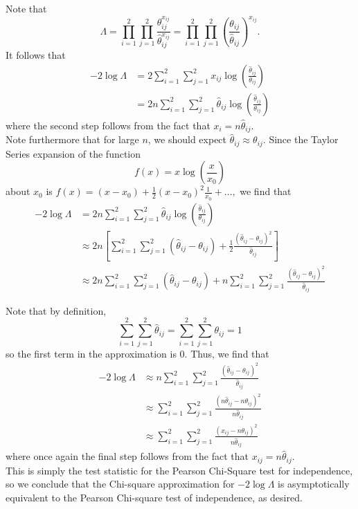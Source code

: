 \begin{enumerate}[a)]
    Note that 
    \[
        \Lambda = \prod_{i=1}^{2}\prod_{j=1}^2 \frac{\theta_{ij}^{x_{ij}}}{\hat{\theta}_{ij}^{x_{ij}}} = \prod_{i=1}^{2}\prod_{j=1}^2 \left( \frac{\theta_{ij}}{\hat{\theta}_{ij}}\right)^{x_{ij}}.
    \]
    It follows that
    \begin{align*}
        -2 \log \Lambda &= 2 \sum_{i=1}^{2} \sum_{j=1}^2 x_{ij} \log \left( \frac{\hat{\theta}_{ij}}{\theta_{ij}} \right) \\
        &= 2n \sum_{i=1}^{2} \sum_{j=1}^2 \hat{\theta}_{ij} \log \left( \frac{\hat{\theta}_{ij}}{\theta_{ij}} \right)
    \end{align*}
    where the second step follows from the fact that $x_i = n\hat{\theta}_{ij}$. \\

    Note furthermore that for large $n$, we should expect $\hat{\theta}_{ij} \approx \theta_{ij}$. Since the Taylor Series expansion of the function
    \[
        f(x) = x \log \left( \frac{x}{x_0} \right)
    \] 
    about $x_0$ is $f(x) = (x - x_0) + \frac{1}{2} (x-x_0)^2 \frac{1}{x_0} + \dots,$ we find that
    \begin{align*}
        -2 \log \Lambda &= 2n \sum_{i=1}^{2} \sum_{j=1}^2 \hat{\theta}_{ij} \log \left( \frac{\hat{\theta}_{ij}}{\theta_{ij}} \right) \\
        &\approx 2n  \left[\sum_{i=1}^{2} \sum_{j=1}^2 \left( \hat{\theta}_{ij} - \theta_{ij} \right) +  \frac{1}{2} \frac{(\hat{\theta}_{ij} - \theta_{ij})^2}{\hat{\theta}_{ij}}\right] \\
        &\approx 2n  \sum_{i=1}^{2} \sum_{j=1}^2 \left( \hat{\theta}_{ij} - \theta_{ij} \right) + n \sum_{i=1}^2 \sum_{j=1}^2 \frac{(\hat{\theta}_{ij} - \theta_{ij})^2}{\hat{\theta}_{ij}}
    \end{align*}

    Note that by definition, 
    \[
        \sum_{i=1}^{2} \sum_{j=1}^2 \hat{\theta}_{ij} = \sum_{i=1}^{2} \sum_{j=1}^2 \theta_{ij} = 1
    \]
    so the first term in the approximation is $0$. Thus, we find that
    \begin{align*}
        -2 \log \Lambda &\approx n \sum_{i=1}^2 \sum_{j=1}^2 \frac{(\hat{\theta}_{ij} - \theta_{ij})^2}{\hat{\theta}_{ij}}\\
        &\approx \sum_{i=1}^2 \sum_{j=1}^2 \frac{(n\hat{\theta}_{ij} - n\theta_{ij})^2}{n\hat{\theta}_{ij}} \\
        &\approx \sum_{i=1}^2 \sum_{j=1}^2 \frac{(x_{ij} - n\theta_{ij})^2}{n\hat{\theta}_{ij}}
    \end{align*}
    where once again the final step follows from the fact that $x_{ij} = n\hat{\theta}_{ij}$. \\
    
    This is simply the test statistic for the Pearson Chi-Square test for independence, so
    we conclude that the Chi-square approximation for $-2\log \Lambda$ is asymptotically equivalent to the Pearson Chi-square test of independence, as desired.
    
    
\end{enumerate}
